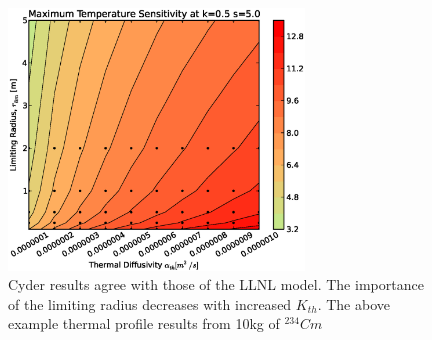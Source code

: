 \begin{figure}[htbp!]
\begin{center}
\includegraphics[width=0.7\textwidth]{./chapters/demonstration/diffusivity/ar.eps}
\end{center}
\caption[$\alpha_{th}$ vs. $r_{lim}$ Sensitivity in Cyder]
{Cyder results agree with 
those of the LLNL model. The importance of the limiting radius decreases with 
increased $K_{th}$. The above example thermal profile results from 10kg of 
$^{234}Cm$}
\label{fig:ak}
\end{figure}
